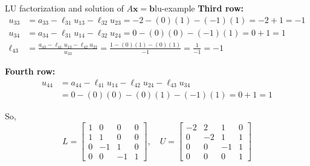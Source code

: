 \begin{example}{LU factorization and solution of $A\mathbf{x} = \mathbf{b}$}{lu-example}
\textbf{Third row:}
\begin{align*}
u_{33} &= a_{33} - \ell_{31} u_{13} - \ell_{32} u_{23} = -2 - (0)(1) - (-1)(1) = -2 + 1 = -1 \\
u_{34} &= a_{34} - \ell_{31} u_{14} - \ell_{32} u_{24} = 0 - (0)(0) - (-1)(1) = 0 + 1 = 1 \\
\ell_{43} &= \frac{a_{43} - \ell_{41} u_{13} - \ell_{42} u_{23}}{u_{33}} = \frac{1 - (0)(1) - (0)(1)}{-1} = \frac{1}{-1} = -1
\end{align*}

\textbf{Fourth row:}
\begin{align*}
u_{44} &= a_{44} - \ell_{41} u_{14} - \ell_{42} u_{24} - \ell_{43} u_{34} \\
    &= 0 - (0)(0) - (0)(1) - (-1)(1) = 0 + 1 = 1
\end{align*}

So,
\[
L = \begin{bmatrix}
1 & 0 & 0 & 0 \\
1 & 1 & 0 & 0 \\
0 & -1 & 1 & 0 \\
0 & 0 & -1 & 1
\end{bmatrix},
\quad
U = \begin{bmatrix}
-2 & 2 & 1 & 0 \\
0 & -2 & 1 & 1 \\
0 & 0 & -1 & 1 \\
0 & 0 & 0 & 1
\end{bmatrix}
\]


\end{example}
